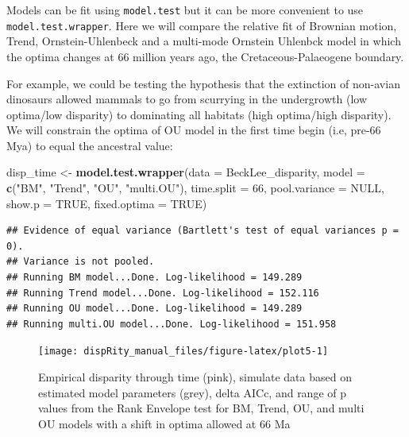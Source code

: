 \documentclass[
]{book}
\newenvironment{Shaded}{\begin{snugshade}}{\end{snugshade}}
\newcommand{\DataTypeTok}[1]{\textcolor[rgb]{0.13,0.29,0.53}{#1}}
\newcommand{\DecValTok}[1]{\textcolor[rgb]{0.00,0.00,0.81}{#1}}
\newcommand{\KeywordTok}[1]{\textcolor[rgb]{0.13,0.29,0.53}{\textbf{#1}}}
\newcommand{\NormalTok}[1]{#1}
\newcommand{\OtherTok}[1]{\textcolor[rgb]{0.56,0.35,0.01}{#1}}
\newcommand{\StringTok}[1]{\textcolor[rgb]{0.31,0.60,0.02}{#1}}
\begin{document}
Models can be fit using \texttt{model.test} but it can be more convenient to use \texttt{model.test.wrapper}.
Here we will compare the relative fit of Brownian motion, Trend, Ornstein-Uhlenbeck and a multi-mode Ornstein Uhlenbck model in which the optima changes at 66 million years ago, the Cretaceous-Palaeogene boundary.

For example, we could be testing the hypothesis that the extinction of non-avian dinosaurs allowed mammals to go from scurrying in the undergrowth (low optima/low disparity) to dominating all habitats (high optima/high disparity).
We will constrain the optima of OU model in the first time begin (i.e, pre-66 Mya) to equal the ancestral value:

\begin{Shaded}
\begin{Highlighting}[]
\NormalTok{disp\_time \textless{}{-}}\StringTok{ }\KeywordTok{model.test.wrapper}\NormalTok{(}\DataTypeTok{data =}\NormalTok{ BeckLee\_disparity,}
                        \DataTypeTok{model =} \KeywordTok{c}\NormalTok{(}\StringTok{"BM"}\NormalTok{, }\StringTok{"Trend"}\NormalTok{, }\StringTok{"OU"}\NormalTok{, }\StringTok{"multi.OU"}\NormalTok{),}
                                \DataTypeTok{time.split =} \DecValTok{66}\NormalTok{,}
                                \DataTypeTok{pool.variance =} \OtherTok{NULL}\NormalTok{,}
                                \DataTypeTok{show.p =} \OtherTok{TRUE}\NormalTok{,}
                                \DataTypeTok{fixed.optima =} \OtherTok{TRUE}\NormalTok{)}
\end{Highlighting}
\end{Shaded}

\begin{verbatim}
## Evidence of equal variance (Bartlett's test of equal variances p = 0).
## Variance is not pooled.
## Running BM model...Done. Log-likelihood = 149.289
## Running Trend model...Done. Log-likelihood = 152.116
## Running OU model...Done. Log-likelihood = 149.289
## Running multi.OU model...Done. Log-likelihood = 151.958
\end{verbatim}

\begin{figure}

{\centering \texttt{[image: dispRity\_manual\_files/figure-latex/plot5-1]} 

}

\caption{Empirical disparity through time (pink), simulate data based on estimated model parameters (grey), delta AICc, and range of p values from the Rank Envelope test for BM, Trend, OU, and multi OU models with a shift in optima allowed at 66 Ma}\label{fig:plot5}
\end{figure}
\end{document}
